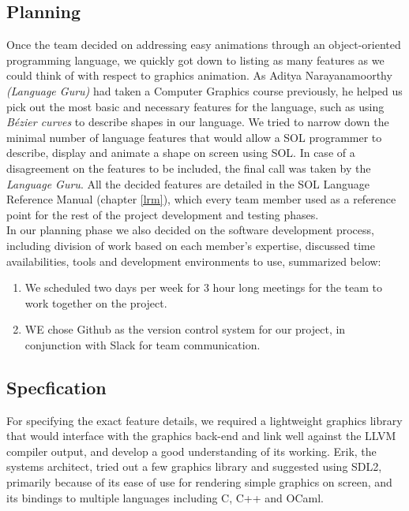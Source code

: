\documentclass[letterpaper,12pt]{report}
\begin{document}
    \subsection{Planning}
      Once the team decided on addressing easy animations through an object-oriented programming language, we quickly got down to listing as many features as we could think of with respect to graphics animation. As Aditya Narayanamoorthy \textit{(Language Guru)} had taken a Computer Graphics course previously, he helped us pick out the most basic and necessary features for the language, such as using \textit{B\'ezier curves} to describe shapes in our language. We tried to narrow down the minimal number of language features that would allow a SOL programmer to describe, display and animate a shape on screen using SOL. In case of a disagreement on the features to be included, the final call was taken by the \textit{Language Guru}. All the decided features are detailed in the SOL Language Reference Manual (chapter \ref{lrm}), which every team member used as a reference point for the rest of the project development and testing phases.\\

      In our planning phase we also decided on the software development process, including division of work based on each member's expertise, discussed time availabilities, tools and development environments to use, summarized below:
      \begin{enumerate}
        \itemsep 0em
        \item We scheduled two days per week for 3 hour long meetings for the team to work together on the project.
        \item WE chose Github as the version control system for our project, in conjunction with Slack for team communication.
      \end{enumerate}

    \subsection{Specfication}
      For specifying the exact feature details, we required a lightweight graphics library that would interface with the graphics back-end and link well against the LLVM compiler output, and develop a good understanding of its working. Erik, the systems architect, tried out a few graphics library and suggested using SDL2, primarily because of its ease of use for rendering simple graphics on screen, and its bindings to multiple languages including C, C++ and OCaml.\\
\end{document}
